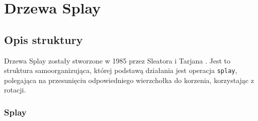 \documentclass[declaration,shortabstract]{iithesis}
\theoremstyle{thm}
\theoremstyle{remark}
\theoremstyle{plain}
\theoremstyle{plain}
\theoremstyle{plain}
\begin{document}
\chapter{Drzewa Splay}   

\section{Opis struktury}  

Drzewa Splay zostały stworzone w 1985 przez Sleatora i Tarjana \cite{DBLP:journals/jacm/SleatorT85}.
Jest to struktura samoorganizująca, której podstawą działania jest operacja \texttt{splay}, polegająca na przesunięciu odpowiedniego wierzchołka do korzenia, korzystając z rotacji.   

\subsection{Splay}  
\end{document}
